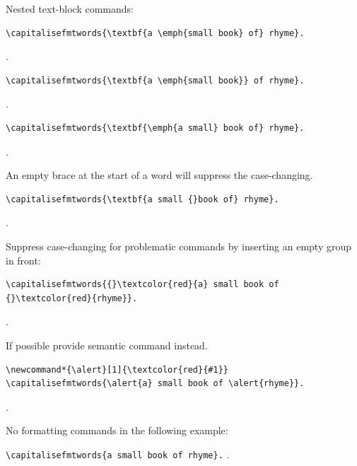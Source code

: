 \documentclass{article}
\begin{document}
\medskip

Nested text-block commands:

\begin{verbatim}
\capitalisefmtwords{\textbf{a \emph{small book} of} rhyme}.
\end{verbatim}
.

\begin{verbatim}
\capitalisefmtwords{\textbf{a \emph{small book}} of rhyme}.
\end{verbatim}
.

\begin{verbatim}
\capitalisefmtwords{\textbf{\emph{a small} book of} rhyme}.
\end{verbatim}
.

\medskip

An empty brace at the start of a word will suppress the
case-changing.

\begin{verbatim}
\capitalisefmtwords{\textbf{a small {}book of} rhyme}.
\end{verbatim}
.

\medskip

Suppress case-changing for problematic commands by inserting
an empty group in front:

\begin{verbatim}
\capitalisefmtwords{{}\textcolor{red}{a} small book of
{}\textcolor{red}{rhyme}}.
\end{verbatim}
.

\medskip

If possible provide semantic command instead.

\begin{verbatim}
\newcommand*{\alert}[1]{\textcolor{red}{#1}}
\capitalisefmtwords{\alert{a} small book of \alert{rhyme}}.
\end{verbatim}
\newcommand*{\alert}[1]{\textcolor{red}{#1}}
\capitalisefmtwords{\alert{a} small book of \alert{rhyme}}.

\medskip

No formatting commands in the following example:

\verb|\capitalisefmtwords{a small book of rhyme}.|
.
\end{document}
